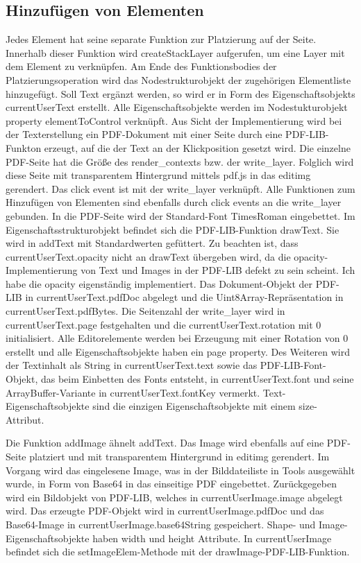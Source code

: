 \subsection{Hinzufügen von Elementen}
Jedes Element hat seine separate Funktion zur Platzierung auf der Seite. Innerhalb dieser Funktion wird createStackLayer aufgerufen, um eine Layer mit dem Element zu verknüpfen. Am Ende des Funktionsbodies der Platzierungsoperation wird das Nodestrukturobjekt der zugehörigen Elementliste hinzugefügt. Soll Text ergänzt werden, so wird er in Form des Eigenschaftsobjekts currentUserText erstellt. Alle Eigenschaftsobjekte werden im Nodestukturobjekt property elementToControl verknüpft. Aus Sicht der Implementierung wird bei der Texterstellung ein PDF-Dokument mit einer Seite durch eine PDF-LIB-Funkton erzeugt, auf die der Text an der Klickposition gesetzt wird. Die einzelne PDF-Seite hat die Größe des render\_contexts bzw. der write\_layer. Folglich wird diese Seite mit transparentem Hintergrund mittels pdf.js in das editimg gerendert. Das click event ist mit der write\_layer verknüpft. Alle Funktionen zum Hinzufügen von Elementen sind ebenfalls durch click events an die write\_layer gebunden. In die PDF-Seite wird der Standard-Font TimesRoman eingebettet. Im Eigenschaftsstrukturobjekt befindet sich die PDF-LIB-Funktion drawText. Sie wird in addText mit Standardwerten gefüttert. Zu beachten ist, dass currentUserText.opacity nicht an drawText übergeben wird, da die opacity-Implementierung von Text und Images in der PDF-LIB defekt zu sein scheint. Ich habe die opacity eigenständig implementiert. Das Dokument-Objekt der PDF-LIB in currentUserText.pdfDoc abgelegt und die Uint8Array-Repräsentation in currentUserText.pdfBytes. Die Seitenzahl der write\_layer wird in currentUserText.page festgehalten und die currentUserText.rotation mit 0 initialisiert. Alle Editorelemente werden bei Erzeugung mit einer Rotation von 0 erstellt und alle Eigenschaftsobjekte haben ein page property. Des Weiteren wird der Textinhalt als String in currentUserText.text sowie das PDF-LIB-Font-Objekt, das beim Einbetten des Fonts entsteht, in currentUserText.font und seine ArrayBuffer-Variante in currentUserText.fontKey vermerkt. Text-Eigenschaftsobjekte sind die einzigen Eigenschaftsobjekte mit einem size-Attribut.
\par
Die Funktion addImage ähnelt addText. Das Image wird ebenfalls auf eine PDF-Seite platziert und mit transparentem Hintergrund in editimg gerendert. Im Vorgang wird das eingelesene Image, was in der Bilddateiliste in Tools ausgewählt wurde, in Form von Base64 in das einseitige PDF eingebettet. Zurückgegeben wird ein Bildobjekt von PDF-LIB, welches in currentUserImage.image abgelegt wird. Das erzeugte PDF-Objekt wird in currentUserImage.pdfDoc und das Base64-Image in currentUserImage.base64String gespeichert. Shape- und Image-Eigenschaftsobjekte haben width und height Attribute. In currentUserImage befindet sich die setImageElem-Methode mit der drawImage-PDF-LIB-Funktion.
